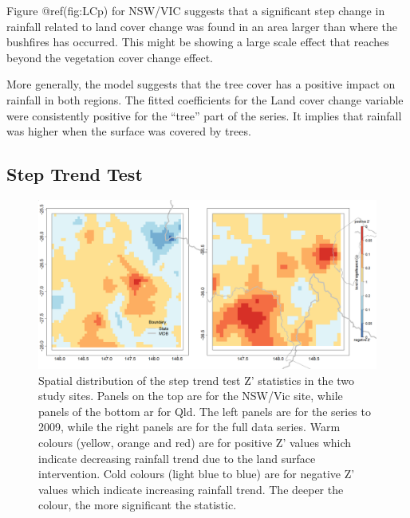 \documentclass[fleqn,10pt,lineno]{wlpeerj} %
\begin{document}
Figure @ref(fig:LCp) for NSW/VIC suggests that a significant step change
in rainfall related to land cover change was found in an area larger
than where the bushfires has occurred. This might be showing a large
scale effect that reaches beyond the vegetation cover change effect.

More generally, the model suggests that the tree cover has a positive
impact on rainfall in both regions. The fitted coefficients for the Land
cover change variable were consistently positive for the ``tree'' part
of the series. It implies that rainfall was higher when the surface was
covered by trees.

\subsection{Step Trend Test}\label{step-trend-test-2}

\begin{figure}
\includegraphics[width=0.9\linewidth]{figures/step_new} \caption{Spatial distribution of the step trend test Z' statistics in the two study sites. Panels on the top are for the NSW/Vic site, while panels of the bottom ar for Qld. The left panels are for the series to 2009, while the right panels are for the full data series. Warm colours (yellow, orange and red) are for positive Z' values which indicate decreasing rainfall trend due to the land surface intervention. Cold colours (light blue to blue) are for negative Z' values which indicate increasing rainfall trend. The deeper the colour, the more significant the statistic.}\label{fig:steptest30}
\end{figure}
\end{document}
